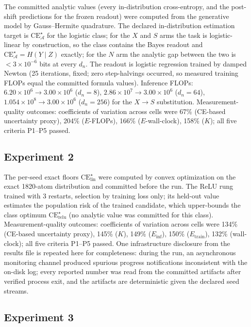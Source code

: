 \documentclass[twocolumn,10pt]{article}
\theoremstyle{definition}
\theoremstyle{remark}
\newcommand{\cA}{\mathcal{A}}
\newcommand{\dn}{d_n}
\newcommand{\CE}{\mathrm{CE}}
\begin{document}
The committed analytic values (every in-distribution cross-entropy,
and the post-shift predictions for the frozen readout) were computed
from the generative model by Gauss--Hermite quadrature. The declared
in-distribution estimation target is $\CE^{\star}_{\cA}$ for the
logistic class; for the $X$ and $S$ arms the task is logistic-linear
by construction, so the class contains the Bayes readout and
$\CE^{\star}_{\cA} = H(Y \mid Z)$ exactly; for the $N$ arm the
analytic gap between the two is $< 3 \times 10^{-6}$ bits at every
$\dn$. The readout is logistic regression trained by damped Newton
(25 iterations, fixed; zero step-halvings occurred, so measured
training FLOPs equal the committed formula values). Inference FLOPs:
$6.20 \times 10^6 \to 3.00 \times 10^6$ ($\dn = 8$),
$2.86 \times 10^7 \to 3.00 \times 10^6$ ($\dn = 64$),
$1.054 \times 10^8 \to 3.00 \times 10^6$ ($\dn = 256$) for the
$X \to S$ substitution. Measurement-quality outcomes: coefficients of
variation across cells were 67\% (CE-based uncertainty proxy), 204\%
($E$-FLOPs), 166\%
($E$-wall-clock), 158\% ($K$); all five criteria P1--P5 passed.

\subsection{Experiment 2}
\label{app:details-e2}

The per-seed exact floors $\CE^{\star}_{\mathrm{lin}}$ were computed
by convex optimization on the exact 1820-atom distribution and
committed before the run. The ReLU rung trained with 3 restarts,
selection by training loss only; its held-out value estimates the
population risk of the trained candidate, which upper-bounds the
class optimum $\CE^{\star}_{\mathrm{relu}}$ (no analytic value was
committed for this class). Measurement-quality outcomes: coefficients
of variation across cells were 134\% (CE-based uncertainty proxy),
145\% ($K$), 149\%
($E_{\mathrm{inf}}$), 150\% ($E_{\mathrm{train}}$), 132\%
(wall-clock); all five criteria P1--P5 passed. One infrastructure
disclosure from the results file is repeated here for completeness:
during the run, an asynchronous monitoring channel produced spurious
progress notifications inconsistent with the on-disk log; every
reported number was read from the committed artifacts after verified
process exit, and the artifacts are deterministic given the declared
seed streams.

\subsection{Experiment 3}
\label{app:details-e3}
\end{document}
